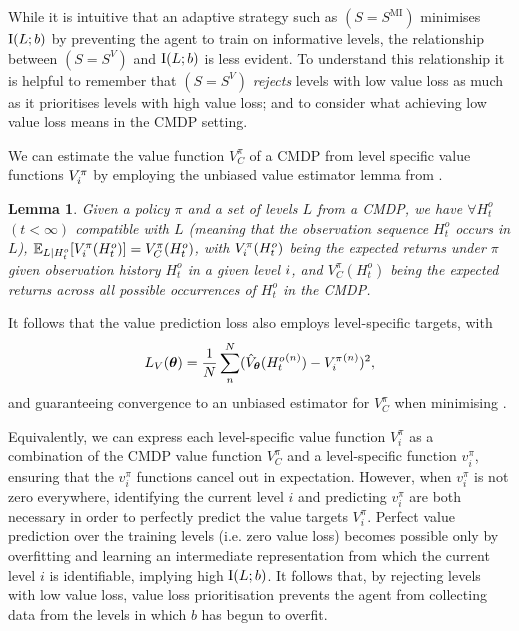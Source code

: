 \documentclass{article}
\theoremstyle{plain}
\newtheorem{lemma}[theorem]{Lemma}
\theoremstyle{definition}
\theoremstyle{remark}
\begin{document}

While it is intuitive that an adaptive strategy such as $(S=S^{\text{MI}})$ minimises $\text{I}(L;b)$ by preventing the agent to train on informative levels, the relationship between $(S=S^{V})$ and $\text{I}(L;b)$ is less evident. To understand this relationship it is helpful to remember that $(S=S^{V})$ \textit{rejects} levels with low value loss as much as it prioritises levels with high value loss; and to consider what achieving low value loss means in the CMDP setting.

We can estimate the value function $V^\pi_C$ of a CMDP from level specific value functions $V^\pi_{i}$ by employing the unbiased value estimator lemma from \citet{instance_invariant}.

\begin{lemma}\label{lem:unbiased_value_estimator}
    Given a policy $\pi$ and a set of levels $L$ from a CMDP, we have $\forall H_t^o$  $(t < \infty)$ compatible with $L$ (meaning that the observation sequence $H_t^o$ occurs in $L$), $\mathbb{E}_{L|H_t^o}[V^\pi_{i}(H_t^o)] = V^\pi_C(H_t^o)$, with $V^\pi_{i}(H_t^o)$ being the expected returns under $\pi$ given observation history $H_t^o$ in a given level $i$, and $V^\pi_C(H_t^o)$ being the expected returns across all possible occurrences of $H_t^o$ in the CMDP.
\end{lemma}
It follows that the value prediction loss also employs level-specific targets, with 
\begin{equation} \label{eq:Lv}
    L_{V}({\bm{\theta}}) = \frac{1}{N} \sum_{n}^N (\hat{V}_{\bm{\theta}}({H_t^{o}}^{(n)}) - {V^\pi_{i}}^{(n)})^2,
\end{equation}
and  guaranteeing convergence to an unbiased estimator for $V^\pi_C$ when minimising . 

Equivalently, we can express each level-specific value function $V^\pi_{i}$ as a combination of the CMDP value function $V^\pi_C$ and a level-specific function $v^\pi_i$,  ensuring that the $v^\pi_i$ functions cancel out in expectation. However, when $v^\pi_i$ is not zero everywhere, identifying the current level $i$ and predicting $v^\pi_i$ are both necessary in order to perfectly predict the value targets $V^\pi_i$. Perfect value prediction over the training levels (i.e. zero value loss) becomes possible only by overfitting and learning an intermediate representation from which the current level $i$ is identifiable, implying high $\text{I}(L;b)$. It follows that, by rejecting levels with low value loss, value loss prioritisation prevents the agent from collecting data from the levels in which $b$ has begun to overfit. 
\end{document}
